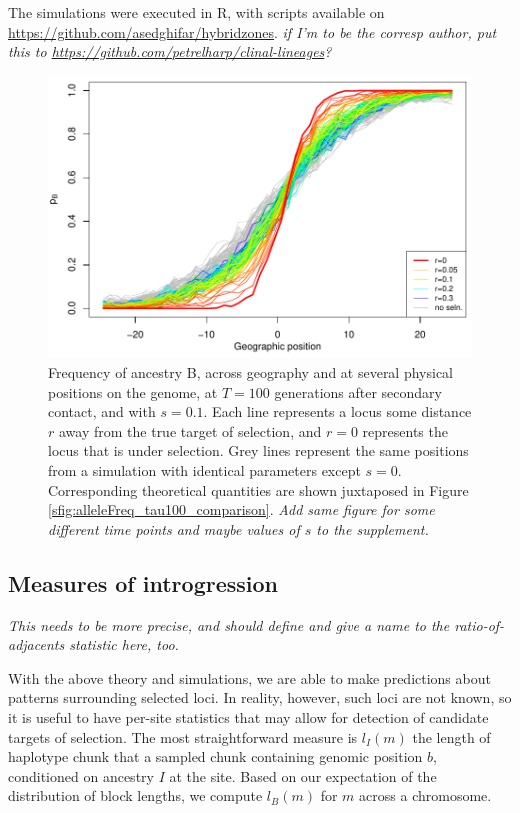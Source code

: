 \documentclass[11pt,letterpaper]{article}
\newcommand{\plr}[1]{{\em \color{blue} #1}}
\begin{document}
The simulations were executed in R, with scripts available on
\url{https://github.com/asedghifar/hybridzones}.
\plr{if I'm to be the corresp author, put this to \url{https://github.com/petrelharp/clinal-lineages}?}

\begin{figure}
\includegraphics{figs/alleleFrequencies_sim}
\caption{
    Frequency of ancestry B,
    across geography and at several physical positions on the genome,
    at $T=100$ generations after secondary contact,
    and with $s=0.1$.
    Each line represents a locus some distance $r$ away from the true target of selection, 
    and $r=0$ represents the locus that is under selection. Grey lines represent the same positions from a simulation with
    identical parameters except $s=0$.
    Corresponding theoretical quantities are shown juxtaposed in Figure \ref{sfig:alleleFreq_tau100_comparison}.
    \plr{Add same figure for some different time points and maybe values of $s$ to the supplement.} 
}\label{alleleFreq_tau100}
\end{figure}

\subsection*{Measures of introgression}

\plr{This needs to be more precise, and should define and give a name to the ratio-of-adjacents statistic here, too.}

With the above theory and simulations, we are able to make predictions about patterns surrounding selected loci. In reality, however, such loci are not known, so it is useful to have per-site statistics that may allow for detection of candidate targets of selection. The most straightforward measure is $l_I(m)$ the length of haplotype chunk that a sampled chunk containing genomic position $b$, conditioned on ancestry $I$ at the site. Based on our expectation of the distribution of block lengths, we compute $l_B(m)$ for $m$ across a chromosome. 
\end{document}
